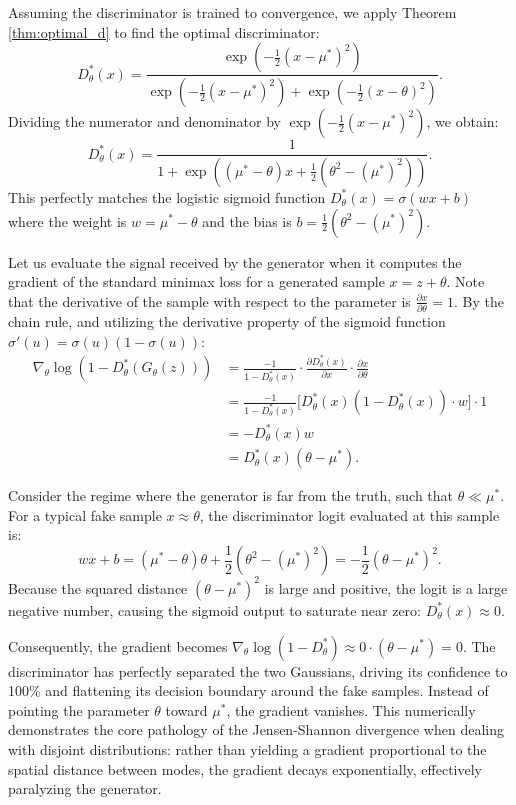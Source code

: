 Assuming the discriminator is trained to convergence, we apply Theorem \ref{thm:optimal_d} to find the optimal discriminator:
\begin{equation}
    D^*_\theta(x) = \frac{\exp(-\frac{1}{2}(x - \mu^*)^2)}{\exp(-\frac{1}{2}(x - \mu^*)^2) + \exp(-\frac{1}{2}(x - \theta)^2)}.
\end{equation}
Dividing the numerator and denominator by $\exp(-\frac{1}{2}(x - \mu^*)^2)$, we obtain:
\begin{equation}
    D^*_\theta(x) = \frac{1}{1 + \exp\left( (\mu^* - \theta)x + \frac{1}{2}(\theta^2 - (\mu^*)^2) \right)}.
\end{equation}
This perfectly matches the logistic sigmoid function $D^*_\theta(x) = \sigma(wx + b)$ where the weight is $w = \mu^* - \theta$ and the bias is $b = \frac{1}{2}(\theta^2 - (\mu^*)^2)$.

Let us evaluate the signal received by the generator when it computes the gradient of the standard minimax loss for a generated sample $x = z + \theta$. Note that the derivative of the sample with respect to the parameter is $\frac{\partial x}{\partial \theta} = 1$. By the chain rule, and utilizing the derivative property of the sigmoid function $\sigma'(u) = \sigma(u)(1 - \sigma(u))$:
\begin{align*}
    \nabla_\theta \log(1 - D^*_\theta(G_\theta(z))) &= \frac{-1}{1 - D^*_\theta(x)} \cdot \frac{\partial D^*_\theta(x)}{\partial x} \cdot \frac{\partial x}{\partial \theta} \\
    &= \frac{-1}{1 - D^*_\theta(x)} \Big[ D^*_\theta(x)(1 - D^*_\theta(x)) \cdot w \Big] \cdot 1 \\
    &= -D^*_\theta(x) w \\
    &= D^*_\theta(x) (\theta - \mu^*).
\end{align*}

Consider the regime where the generator is far from the truth, such that $\theta \ll \mu^*$. For a typical fake sample $x \approx \theta$, the discriminator logit evaluated at this sample is:
\begin{equation}
    wx + b = (\mu^* - \theta)\theta + \frac{1}{2}(\theta^2 - (\mu^*)^2) = -\frac{1}{2}(\theta - \mu^*)^2.
\end{equation}
Because the squared distance $(\theta - \mu^*)^2$ is large and positive, the logit is a large negative number, causing the sigmoid output to saturate near zero: $D^*_\theta(x) \approx 0$. 

Consequently, the gradient becomes $\nabla_\theta \log(1 - D^*_\theta) \approx 0 \cdot (\theta - \mu^*) = 0$. The discriminator has perfectly separated the two Gaussians, driving its confidence to 100\% and flattening its decision boundary around the fake samples. Instead of pointing the parameter $\theta$ toward $\mu^*$, the gradient vanishes. This numerically demonstrates the core pathology of the Jensen-Shannon divergence when dealing with disjoint distributions: rather than yielding a gradient proportional to the spatial distance between modes, the gradient decays exponentially, effectively paralyzing the generator.

